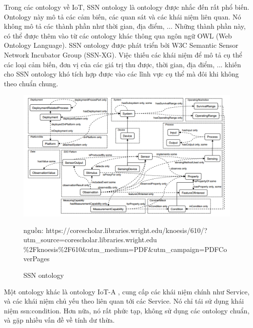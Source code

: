 Trong các ontology về IoT, SSN ontology \cite{ssnontology} là ontology được nhắc đến rất phổ biến. Ontology này mô tả các cảm biến, các quan sát và các khái niệm liên quan. Nó không mô tả các thành phần như thời gian, địa điểm, ... Những thành phần này, có thể được thêm vào từ các ontology khác thông qua ngôn ngữ OWL (Web Ontology Language).
SSN ontology được phát triển bởi W3C Semantic Sensor Network Incubator Group (SSN-XG). Việc thiếu các khái niệm để mô tả cụ thể các loại cảm biến, đơn vị của các giá trị thu được, thời gian, địa điểm, ... khiến cho SSN ontology khó tích hợp được vào các lĩnh vực cụ thể mà đôi khi không theo chuẩn chung.

\begin{figure}[h!]
	\center
	\includegraphics[scale=0.4]{image/ssn_ontology} \\
	\caption{SSN ontology}
	\small nguồn: https://corescholar.libraries.wright.edu/knoesis/610/?utm\_source=corescholar.libraries.wright.edu \%2Fknoesis\%2F610\&utm\_medium=PDF\&utm\_campaign=PDFCoverPages
\end{figure}

Một ontology khác là ontology IoT-A \cite{iotaontology}, cung cấp các khái niệm chính như Service, và các khái niệm chủ yếu theo liên quan tới các Service. Nó chỉ tái sử dụng khái niệm ssn:condition. Hơn nữa, nó rất phức tạp, không sử dụng các ontology chuẩn, và gặp nhiều vấn đề về tính dư thừa. 
\clearpage

